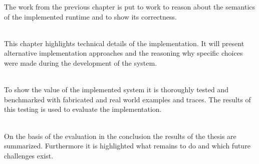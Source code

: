 The work from the previous chapter is put to work to reason about the semantics of the implemented runtime and to show its correctness.

\textbf{} \\[0.2em]

This chapter highlights technical details of the implementation.
It will present alternative implementation approaches and the reasoning why specific choices were made during the development of the system.

\textbf{} \\[0.2em]

To show the value of the implemented system it is thoroughly tested and benchmarked with fabricated and real world examples and traces.
The results of this testing is used to evaluate the implementation.

\textbf{} \\[0.2em]

On the basis of the evaluation in the conclusion the results of the thesis are summarized.
Furthermore it is highlighted what remains to do and which future challenges exist.


